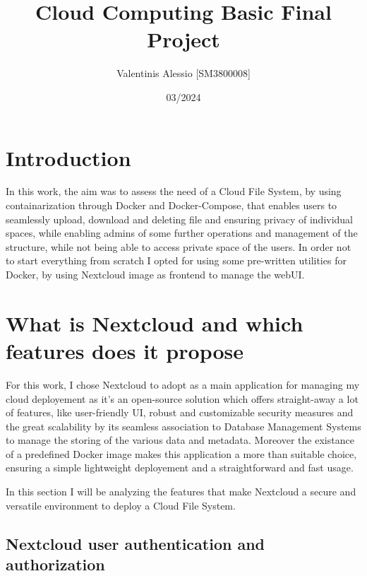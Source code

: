 \documentclass{article}
\title{Cloud Computing Basic Final Project}
\author{Valentinis Alessio [SM3800008]}
\date{03/2024}
\begin{document}
	\maketitle
	\tableofcontents
	
	\section{Introduction}
	In this work, the aim was to assess the need of a Cloud File System, by using containarization through Docker and Docker-Compose, that enables users to seamlessly upload, download and deleting file and ensuring privacy of individual spaces, while enabling admins of some further operations and management of the structure, while not being able to access private space of the users. In order not to start everything from scratch I opted for using some pre-written utilities for Docker, by using Nextcloud image as frontend to manage the webUI.
	
	\section{What is Nextcloud and which features does it propose}
	For this work, I chose Nextcloud to adopt as a main application for managing my cloud deployement as it's an open-source solution which offers straight-away a lot of features, like user-friendly UI, robust and customizable security measures and the great scalability by its seamless association to Database Management Systems to manage the storing of the various data and metadata. Moreover the existance of a predefined Docker image makes this application a more than suitable choice, ensuring a simple lightweight deployement and a straightforward and fast usage.
	
	In this section I will be analyzing the features that make Nextcloud a secure and versatile environment to deploy a Cloud File System.
	
	\subsection{Nextcloud user authentication and authorization}
	
\end{document}
